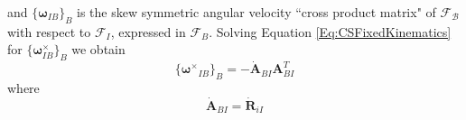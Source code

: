 %
and $\{\mathbf{\boldsymbol\omega}_{IB}\}_B$ is the skew symmetric angular
velocity ``cross product matrix" of $\mathcal{F_B}$ with respect to
$\mathcal{F}_I$, expressed in $\mathcal{F}_B$.  Solving Equation
\ref{Eq:CSFixedKinematics} for $\{\mathbf{\boldsymbol\omega}_{IB}^\times\}_B$
we obtain
%
\begin{equation}
    \{\mathbf{\boldsymbol\omega^\times}_{IB}\}_B =  -\dot{\mathbf{A}}_{BI}\mathbf{A}_{BI}^{T}
    \label{Eq:CSFixedKinematics2}
\end{equation}
%
where 
%
\begin{equation}
     \dot{\mathbf{A}}_{BI} = \dot{\mathbf{R}}_{iI}
    \label{Eq:CSFixedKinematics2}
\end{equation}
